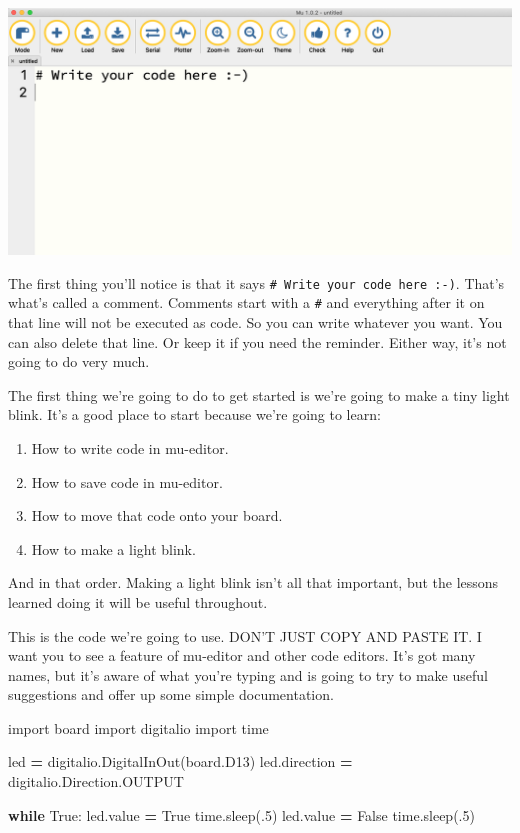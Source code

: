 \documentclass[
]{book}
\newenvironment{Shaded}{\begin{snugshade}}{\end{snugshade}}
\newcommand{\ControlFlowTok}[1]{\textcolor[rgb]{0.13,0.29,0.53}{\textbf{#1}}}
\newcommand{\DecValTok}[1]{\textcolor[rgb]{0.00,0.00,0.81}{#1}}
\newcommand{\ImportTok}[1]{#1}
\newcommand{\NormalTok}[1]{#1}
\newcommand{\OperatorTok}[1]{\textcolor[rgb]{0.81,0.36,0.00}{\textbf{#1}}}
\newcommand{\VariableTok}[1]{\textcolor[rgb]{0.00,0.00,0.00}{#1}}
\providecommand{\tightlist}{%
  \setlength{\itemsep}{0pt}\setlength{\parskip}{0pt}}
\begin{document}
\includegraphics[width=1\linewidth]{images/03image1}

The first thing you'll notice is that it says \texttt{\#\ Write\ your\ code\ here\ :-)}. That's what's called a comment. Comments start with a \texttt{\#} and everything after it on that line will not be executed as code. So you can write whatever you want. You can also delete that line. Or keep it if you need the reminder. Either way, it's not going to do very much.

The first thing we're going to do to get started is we're going to make a tiny light blink. It's a good place to start because we're going to learn:

\begin{enumerate}
\def\labelenumi{\arabic{enumi}.}
\tightlist
\item
  How to write code in mu-editor.
\item
  How to save code in mu-editor.
\item
  How to move that code onto your board.
\item
  How to make a light blink.
\end{enumerate}

And in that order. Making a light blink isn't all that important, but the lessons learned doing it will be useful throughout.

This is the code we're going to use. DON'T JUST COPY AND PASTE IT. I want you to see a feature of mu-editor and other code editors. It's got many names, but it's aware of what you're typing and is going to try to make useful suggestions and offer up some simple documentation.

\begin{Shaded}
\begin{Highlighting}[]
\ImportTok{import}\NormalTok{ board}
\ImportTok{import}\NormalTok{ digitalio}
\ImportTok{import}\NormalTok{ time}

\NormalTok{led }\OperatorTok{=}\NormalTok{ digitalio.DigitalInOut(board.D13)}
\NormalTok{led.direction }\OperatorTok{=}\NormalTok{ digitalio.Direction.OUTPUT}

\ControlFlowTok{while} \VariableTok{True}\NormalTok{:}
\NormalTok{    led.value }\OperatorTok{=} \VariableTok{True}
\NormalTok{    time.sleep(.}\DecValTok{5}\NormalTok{)}
\NormalTok{    led.value }\OperatorTok{=} \VariableTok{False}
\NormalTok{    time.sleep(.}\DecValTok{5}\NormalTok{)}
\end{Highlighting}
\end{Shaded}
\end{document}
